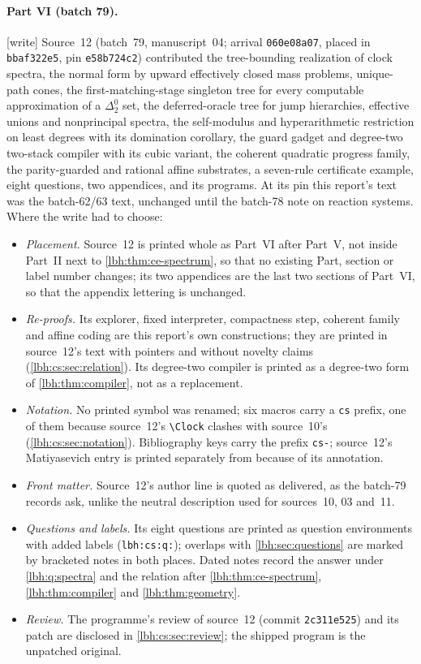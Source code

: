 \documentclass[11pt,letterpaper]{article}
\theoremstyle{definition}
\theoremstyle{remark}
\newcommand{\1}{\mathbf 1}
\newcommand{\wtag}{\textup{[write]}}%
\begin{document}
\paragraph{Part VI (batch 79).} \wtag{} Source~12 (batch~79, manuscript~04; arrival
\texttt{060e08a07}, placed in \texttt{bbaf322e5}, pin \texttt{e58b724c2}) contributed the
tree-bounding realization of clock spectra, the normal form by upward effectively closed mass
problems, unique-path cones, the first-matching-stage singleton tree for every computable
approximation of a $\Delta^0_2$ set, the deferred-oracle tree for jump hierarchies, effective unions
and nonprincipal spectra, the self-modulus and hyperarithmetic restriction on least degrees with its
domination corollary, the guard gadget and degree-two two-stack compiler with its cubic variant, the
coherent quadratic progress family, the parity-guarded and rational affine substrates, a seven-rule
certificate example, eight questions, two appendices, and its programs. At its pin this report's
text was the batch-62/63 text, unchanged until the batch-78 note on reaction systems.
Where the write had to choose:
\begin{itemize}
\item \emph{Placement.} Source~12 is printed whole as Part~VI after Part~V, not inside Part~II next
to \cref{lbh:thm:ce-spectrum}, so that no existing Part, section or label number changes; its two
appendices are the last two sections of Part~VI, so that the appendix lettering is unchanged.
\item \emph{Re-proofs.} Its explorer, fixed interpreter, compactness step, coherent family and
affine coding are this report's own constructions; they are printed in source~12's text with
pointers and without novelty claims (\cref{lbh:cs:sec:relation}). Its degree-two compiler is
printed as a degree-two form of \cref{lbh:thm:compiler}, not as a replacement.
\item \emph{Notation.} No printed symbol was renamed; six macros carry a \texttt{cs} prefix, one of
them because source~12's \texttt{\textbackslash Clock} clashes with source~10's
(\cref{lbh:cs:sec:notation}). Bibliography keys carry the prefix \texttt{cs-}; source~12's
Matiyasevich entry is printed separately from \cite{matiyasevich1970} because of its annotation.
\item \emph{Front matter.} Source~12's author line is quoted as delivered, as the batch-79 records
ask, unlike the neutral description used for sources~10, 03 and~11.
\item \emph{Questions and labels.} Its eight questions are printed as question environments with
added labels (\texttt{lbh:cs:q:}); overlaps with \cref{lbh:sec:questions} are marked by bracketed
notes in both places. Dated notes record the answer under \cref{lbh:q:spectra} and the relation
after \cref{lbh:thm:ce-spectrum}, \cref{lbh:thm:compiler} and \cref{lbh:thm:geometry}.
\item \emph{Review.} The programme's review of source~12 (commit \texttt{2c311e525}) and its patch
are disclosed in \cref{lbh:cs:sec:review}; the shipped program is the unpatched original.
\end{itemize}
\end{document}
